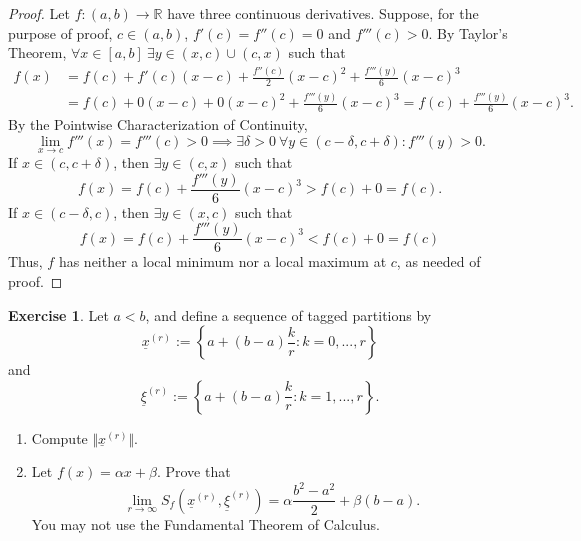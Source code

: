 \documentclass[12pt]{article}
\theoremstyle{definition}
\newtheorem{exercise}{Exercise}
\begin{document}
\begin{proof}
    Let \(f : (a, b) \to \mathbb{R}\) have three continuous derivatives. Suppose, for the purpose of proof, \(c \in (a, b)\), \(f'(c) = f''(c) = 0\) and \(f'''(c) > 0\). By Taylor's Theorem, \(\forall x \in [a, b] \ \exists y \in (x, c) \cup (c, x)\) such that
    \begin{align*}
        f(x) &= f(c) + f'(c)(x - c) + \frac{f''(c)}{2}(x - c)^2 + \frac{f'''(y)}{6}(x - c)^3 \\
        &= f(c) + 0(x - c) + 0(x - c)^2 + \frac{f'''(y)}{6}(x - c)^3 = f(c) + \frac{f'''(y)}{6}(x - c)^3.
    \end{align*}
    By the Pointwise Characterization of Continuity,
    \[
        \lim_{x \to c}f'''(x) = f'''(c) > 0 \implies \exists \delta > 0 \ \forall y \in (c - \delta, c + \delta) : f'''(y) > 0. 
    \]
    If \(x \in (c, c + \delta)\), then \(\exists y \in (c, x)\) such that
    \[
        f(x) = f(c) + \frac{f'''(y)}{6}(x - c)^3 > f(c) + 0 = f(c).
    \]
    If \(x \in (c - \delta, c)\), then \(\exists y \in (x, c)\) such that
    \[
        f(x) = f(c) + \frac{f'''(y)}{6}(x - c)^3 < f(c) + 0 = f(c)
    \]
    Thus, \(f\) has neither a local minimum nor a local maximum at \(c\), as needed of proof.  
\end{proof}

\begin{exercise}
    Let \(a < b\), and define a sequence of tagged partitions by
    \[
        \underline{x}^{(r)} := \left\{a + (b - a)\frac{k}{r} : k = 0,...,r\right\}
    \]
    and 
    \[
        \underline{\xi}^{(r)} := \left\{a + (b - a)\frac{k}{r} : k = 1,...,r\right\}.
    \]
    \begin{enumerate}[label=(\alph*)]
        \item Compute \(\Vert \underline{x}^{(r)} \Vert\).
        \item Let \(f(x) = \alpha x + \beta\). Prove that
        \[
            \lim_{r \to \infty}S_f\left(\underline{x}^{(r)}, \underline{\xi}^{(r)}\right) = \alpha\frac{b^2 - a^2}{2} + \beta(b - a).
        \]
        You may not use the Fundamental Theorem of Calculus.
    \end{enumerate}
\end{exercise}
\end{document}
